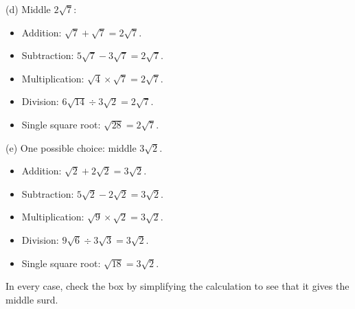 \documentclass[12pt,a4paper]{article}
\begin{document}
(d) Middle $2\sqrt7$:
\begin{itemize}
\item Addition: $\sqrt7+\sqrt7 = 2\sqrt7$.
\item Subtraction: $5\sqrt7-3\sqrt7 = 2\sqrt7$.
\item Multiplication: $\sqrt4\times\sqrt7 = 2\sqrt7$.
\item Division: $6\sqrt{14}\div3\sqrt2 = 2\sqrt7$.
\item Single square root: $\sqrt{28} = 2\sqrt7$.
\end{itemize}

(e) One possible choice: middle $3\sqrt2$.
\begin{itemize}
\item Addition: $\sqrt2+2\sqrt2 = 3\sqrt2$.
\item Subtraction: $5\sqrt2-2\sqrt2 = 3\sqrt2$.
\item Multiplication: $\sqrt9\times\sqrt2 = 3\sqrt2$.
\item Division: $9\sqrt6\div3\sqrt3 = 3\sqrt2$.
\item Single square root: $\sqrt{18} = 3\sqrt2$.
\end{itemize}

In every case, check the box by simplifying the calculation to see that it gives the middle surd.
\end{document}
